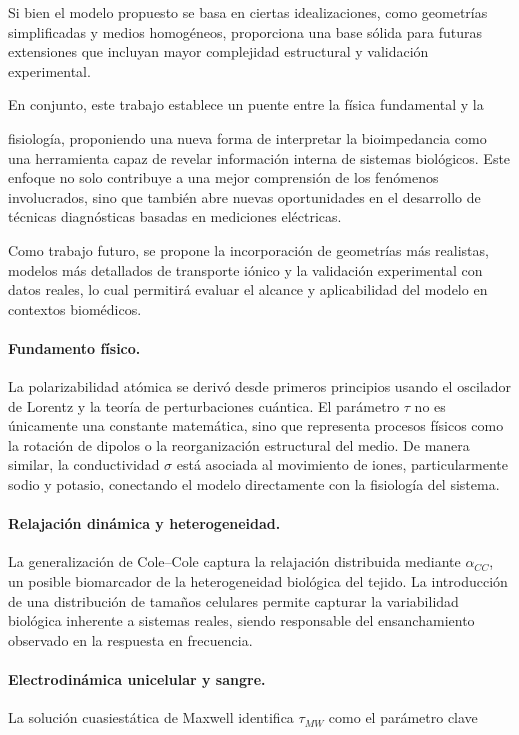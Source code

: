 \documentclass[12pt]{article}
\begin{document}
Si bien el modelo propuesto se basa en ciertas idealizaciones, como geometr\'ias
simplificadas y medios homog\'eneos, proporciona una base s\'olida para futuras
extensiones que incluyan mayor complejidad estructural y validaci\'on experimental.

En conjunto, este trabajo establece un puente entre la f\'isica fundamental y la

fisiolog\'ia, proponiendo una nueva forma de interpretar la bioimpedancia como
una herramienta capaz de revelar informaci\'on interna de sistemas biol\'ogicos.
Este enfoque no solo contribuye a una mejor comprensi\'on de los fen\'omenos
involucrados, sino que tambi\'en abre nuevas oportunidades en el desarrollo de
t\'ecnicas diagn\'osticas basadas en mediciones el\'ectricas.

Como trabajo futuro, se propone la incorporaci\'on de geometr\'ias m\'as realistas,
modelos m\'as detallados de transporte i\'onico y la validaci\'on experimental con
datos reales, lo cual permitir\'a evaluar el alcance y aplicabilidad del modelo
en contextos biom\'edicos.

\paragraph{Fundamento f\'isico.}
La polarizabilidad at\'omica se deriv\'o desde primeros principios usando el
oscilador de Lorentz y la teor\'ia de perturbaciones cu\'antica. El par\'ametro
$\tau$ no es \'unicamente una constante matem\'atica, sino que representa procesos
f\'isicos como la rotaci\'on de dipolos o la reorganizaci\'on estructural del medio.
De manera similar, la conductividad $\sigma$ est\'a asociada al movimiento de iones,
particularmente sodio y potasio, conectando el modelo directamente con la
fisiolog\'ia del sistema.

\paragraph{Relajaci\'on din\'amica y heterogeneidad.}
La generalizaci\'on de Cole--Cole captura la relajaci\'on distribuida mediante
$\alpha_{CC}$, un posible biomarcador de la heterogeneidad biol\'ogica del tejido.
La introducci\'on de una distribuci\'on de tama\~{n}os celulares permite capturar
la variabilidad biol\'ogica inherente a sistemas reales, siendo responsable del
ensanchamiento observado en la respuesta en frecuencia.

\paragraph{Electrodin\'amica unicelular y sangre.}
La soluci\'on cuasiestática de Maxwell identifica $\tau_{MW}$ como el par\'ametro clave
\end{document}

